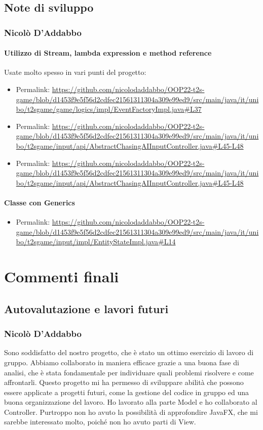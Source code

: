 \documentclass[a4paper,12pt]{report}
\begin{document}
\section{Note di sviluppo}

\subsection*{Nicolò D'Addabbo}
\subsubsection*{Utilizzo di Stream, lambda expression e method reference}
Usate molto spesso in vari punti del progetto:
\begin{itemize}
	\item Permalink: \url{https://github.com/nicolodaddabbo/OOP22-t2s-game/blob/d1453f9e5f56d2cdfec21561311304a309e99ed9/src/main/java/it/unibo/t2sgame/game/logics/impl/EventFactoryImpl.java#L37}
	\item Permalink: \url{https://github.com/nicolodaddabbo/OOP22-t2s-game/blob/d1453f9e5f56d2cdfec21561311304a309e99ed9/src/main/java/it/unibo/t2sgame/input/api/AbstractChasingAIInputController.java#L45-L48}
	\item Permalink: \url{https://github.com/nicolodaddabbo/OOP22-t2s-game/blob/d1453f9e5f56d2cdfec21561311304a309e99ed9/src/main/java/it/unibo/t2sgame/input/api/AbstractChasingAIInputController.java#L45-L48}
\end{itemize}
\subsubsection*{Classe con Generics}
\begin{itemize}
	\item Permalink: \url{https://github.com/nicolodaddabbo/OOP22-t2s-game/blob/d1453f9e5f56d2cdfec21561311304a309e99ed9/src/main/java/it/unibo/t2sgame/input/impl/EntityStateImpl.java#L14}
\end{itemize}

\chapter{Commenti finali}

\section{Autovalutazione e lavori futuri}
\subsection*{Nicolò D'Addabbo}
Sono soddisfatto del nostro progetto, che è stato un ottimo esercizio di lavoro di gruppo. Abbiamo collaborato in maniera efficace grazie a una buona fase di analisi, che è stata fondamentale per individuare quali problemi risolvere e come affrontarli. Questo progetto mi ha permesso di sviluppare abilità che possono essere applicate a progetti futuri, come la gestione del codice in gruppo ed una buona organizzazione del lavoro.
Ho lavorato alla parte Model e ho collaborato al Controller. Purtroppo non ho avuto la possibilità di approfondire JavaFX, che mi sarebbe interessato molto, poiché non ho avuto parti di View.
\end{document}
